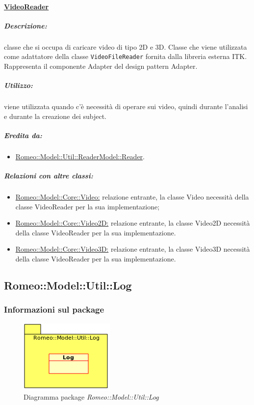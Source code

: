 		\paragraph{\underline{VideoReader}}
		\label{rea_video}
			\subparagraph{Descrizione:} classe che si occupa di caricare video di tipo 2D e 3D. Classe che viene utilizzata come adattatore della classe \verb!VideoFileReader! fornita dalla libreria
			esterna ITK\g{}.
			\\Rappresenta il componente Adapter del design pattern\g{} Adapter.
			\subparagraph{Utilizzo:} viene utilizzata quando c'è necessità di operare sui video, quindi durante l'analisi e durante la creazione dei subject.
			\subparagraph{Eredita da:}
				\begin{itemize}
					\item \hyperref[reader]{Romeo::Model::Util::ReaderModel::Reader}.
				\end{itemize}
			\subparagraph{Relazioni con altre classi:}
				\begin{itemize}
						\item \hyperref[]{Romeo::Model::Core::Video:} relazione entrante, la classe Video necessità della classe VideoReader per la sua implementazione;
						\item \hyperref[]{Romeo::Model::Core::Video2D:} relazione entrante, la classe Video2D necessità della classe VideoReader per la sua implementazione.					
						\item \hyperref[]{Romeo::Model::Core::Video3D:}	relazione entrante, la classe Video3D necessità della classe VideoReader per la sua implementazione.										
				\end{itemize}
				\pagebreak




	\subsection{Romeo::Model::Util::Log}
	\label{romeo::model::util::log}
		\subsubsection{Informazioni sul package}
		\label{info_log}
		\begin{figure}[!h]
			\centering
			\includegraphics[width=0.6\linewidth]{./Content/Immagini/Romeo__Model__Util__Log.png}
			\caption{Diagramma package\g{} \textsl{Romeo::Model::Util::Log}}
			\label{comp_log}
		\end{figure}
